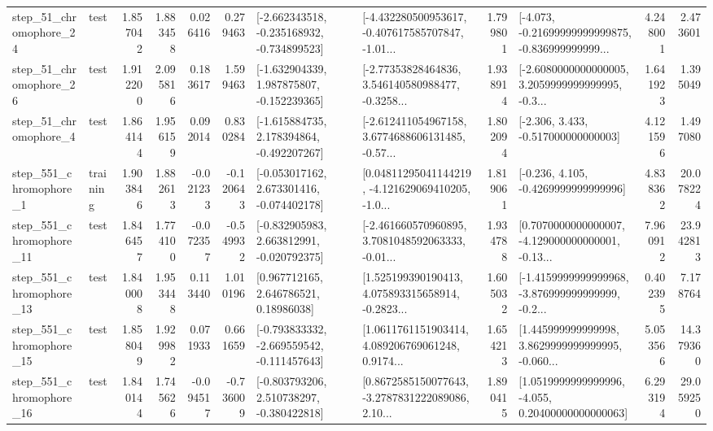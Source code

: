\begin{tabular}{llrrrrllrlrr}
   step\_51\_chromophore\_24 &      test &      1.857042 &    1.883458 &      0.026416 &  0.279463 &  [-2.662343518, -0.235168932, -0.734899523] &  [-4.432280500953617, -0.407617585707847, -1.01... &       1.799801 &  [-4.073, -0.21699999999999875, -0.836999999999... &            4.248001 &          2.473601 \\
   step\_51\_chromophore\_26 &      test &      1.912200 &    2.095816 &      0.183617 &  1.599463 &   [-1.632904339, 1.987875807, -0.152239365] &  [-2.77353828464836, 3.546140580988477, -0.3258... &       1.938914 &  [-2.6080000000000005, 3.2059999999999995, -0.3... &            1.641923 &          1.395049 \\
    step\_51\_chromophore\_4 &      test &      1.864144 &    1.956159 &      0.092014 &  0.830284 &   [-1.615884735, 2.178394864, -0.492207267] &  [-2.612411054967158, 3.6774688606131485, -0.57... &       1.802094 &                [-2.306, 3.433, -0.517000000000003] &            4.121596 &          1.497080 \\
   step\_551\_chromophore\_1 &  training &      1.903846 &    1.882613 &     -0.021233 & -0.120643 &   [-0.053017162, 2.673301416, -0.074402178] &  [0.04811295041144219, -4.121629069410205, -1.0... &       1.819061 &               [-0.236, 4.105, -0.4269999999999996] &            4.838362 &         20.078224 \\
  step\_551\_chromophore\_11 &      test &      1.846457 &    1.774100 &     -0.072357 & -0.549932 &   [-0.832905983, 2.663812991, -0.020792375] &  [-2.461660570960895, 3.7081048592063333, -0.01... &       1.934788 &  [0.7070000000000007, -4.129000000000001, -0.13... &            7.960912 &         23.942813 \\
  step\_551\_chromophore\_13 &      test &      1.840008 &    1.953448 &      0.113440 &  1.010196 &      [0.967712165, 2.646786521, 0.18986038] &  [1.525199390190413, 4.075893315658914, -0.2823... &       1.605032 &  [-1.4159999999999968, -3.876999999999999, -0.2... &            0.402395 &          7.178764 \\
  step\_551\_chromophore\_15 &      test &      1.858049 &    1.929982 &      0.071933 &  0.661659 &  [-0.793833332, -2.669559542, -0.111457643] &  [1.0611761151903414, 4.089206769061248, 0.9174... &       1.654213 &  [1.445999999999998, 3.8629999999999995, -0.060... &            5.053566 &         14.379360 \\
  step\_551\_chromophore\_16 &      test &      1.840144 &    1.745626 &     -0.094517 & -0.736009 &   [-0.803793206, 2.510738297, -0.380422818] &  [0.8672585150077643, -3.2787831222089086, 2.10... &       1.890415 &  [1.0519999999999996, -4.055, 0.20400000000000063] &            6.293194 &         29.059250 \\

\end{tabular}
